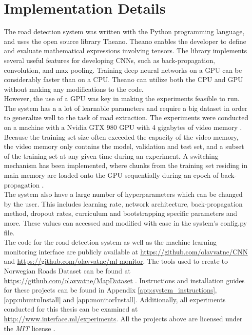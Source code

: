 \section{Implementation Details}
\label{sec:methods_implementation_details}
The road detection system was written with the Python programming language, and uses the open source library Theano. Theano enables the developer to define and evaluate mathematical expressions involving tensors. The library implements several useful features for developing \ac{CNN}s, such as back-propagation, convolution, and max pooling. Training deep neural networks on a \ac{GPU} can be considerably faster than on a \ac{CPU}. Theano can utilize both the \ac{CPU} and \ac{GPU} without making any modifications to the code.\\

However, the use of a \ac{GPU} was key in making the experiments feasible to run. The system has a a lot of learnable  parameters and require a big dataset in order to generalize well to the task of road extraction. The experiments were conducted on a machine with a Nvidia GTX 980 \ac{GPU} with 4 gigabytes of video memory . \\

Because the training set size often exceeded the capacity of the video memory, the video memory only contains the model, validation and test set, and a subset of the training set at any given time during an experiment. A switching mechanism has been implemented, where chunks from the training set residing in main memory are loaded onto the \ac{GPU} sequentially during an epoch of back-propagation .\\

The system also have a large number of hyperparameters which can be changed by the user. This includes learning rate, network architecture, back-propagation method, dropout rates, curriculum and bootstrapping specific parameters and more. These values can accessed and modified with ease in the system's config.py file. \\

The code for the road detection system as well as the machine learning monitoring interface are publicly available at 
\url{https://github.com/olavvatne/CNN} and \url{https://github.com/olavvatne/ml-monitor}. The tools used to create to Norwegian Roads Dataset can be found at \url{https://github.com/olavvatne/MapDataset} . Instructions and installation guides for these projects can be found in Appendix \ref{app:system_instructions}, \ref{app:ubuntuInstall} and \ref{app:monitorInstall}. Additionally, all experiments conducted for this thesis can be examined at \url{http://www.interface.ml/experiments}. All the projects above are licensed under the \emph{MIT} license .

